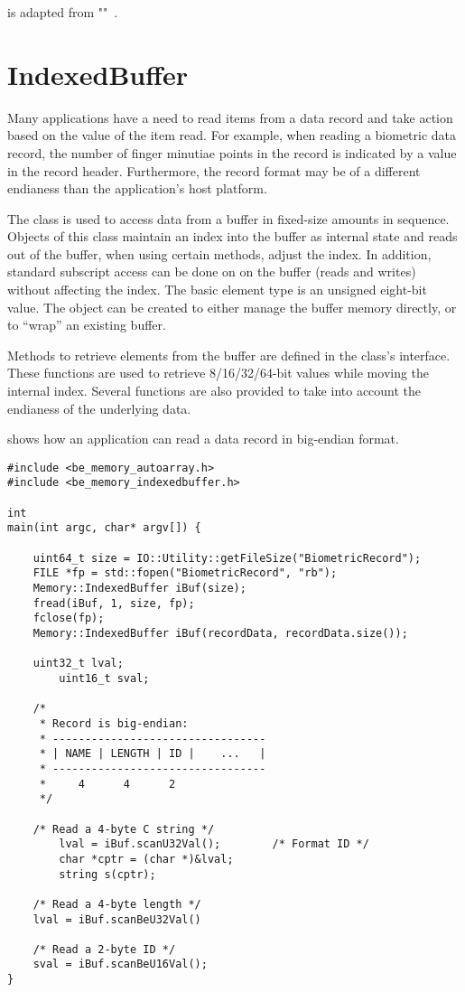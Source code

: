  is adapted from ""~\cite[496]{cpp:plguide}.

\section{IndexedBuffer}
\label{sec-indexedbuffer}
Many applications have a need to read items from a data record and take
action based on the value of the item read. For example, when reading a
biometric data record, the number of finger minutiae points in the record
is indicated by a value in the record header. Furthermore, the record format
may be of a different endianess than the application's host platform.

The  class is used to access data from a buffer in fixed-size
amounts in sequence. Objects of this class maintain an index into the buffer
as internal state and reads out of the buffer, when using certain methods,
adjust the index. In addition, standard subscript access can be done on
on the buffer (reads and writes) without affecting the index. The basic element
type is an unsigned eight-bit value.
The  object can be created to either manage the buffer memory
directly, or to ``wrap'' an existing buffer. 

Methods to retrieve elements from the buffer are defined in the class's
interface. These functions are used to retrieve 8/16/32/64-bit values while
moving the internal index. Several functions are also provided to take into
account the endianess of the underlying data.

 shows how an application can read a data record in
big-endian format.

\begin{lstlisting}[caption={Using the \class{IndexedBuffer}}, label=indexedbufferuse]
#include <be_memory_autoarray.h>
#include <be_memory_indexedbuffer.h>

int
main(int argc, char* argv[]) {

	uint64_t size = IO::Utility::getFileSize("BiometricRecord");
	FILE *fp = std::fopen("BiometricRecord", "rb");
	Memory::IndexedBuffer iBuf(size);
	fread(iBuf, 1, size, fp);
	fclose(fp);
	Memory::IndexedBuffer iBuf(recordData, recordData.size());

	uint32_t lval;
        uint16_t sval;

	/*
	 * Record is big-endian:
	 * ---------------------------------
	 * | NAME | LENGTH | ID |    ...   |
	 * ---------------------------------
	 *     4      4      2
	 */

	/* Read a 4-byte C string */
        lval = iBuf.scanU32Val();        /* Format ID */
        char *cptr = (char *)&lval;
        string s(cptr);

	/* Read a 4-byte length */
	lval = iBuf.scanBeU32Val()

	/* Read a 2-byte ID */
	sval = iBuf.scanBeU16Val();
}
\end{lstlisting}
